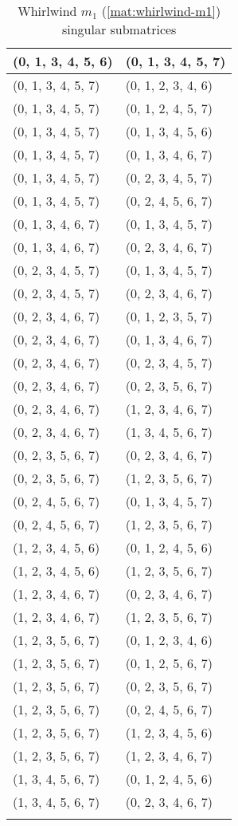 \begin{footnotesize}
\begin{longtable}[c]{|l|l|}
\\ \hline
(0, 1, 3, 4, 5, 6)
&(0, 1, 3, 4, 5, 7)
\\ \hline
(0, 1, 3, 4, 5, 7)
&(0, 1, 2, 3, 4, 6)
\\ \hline
(0, 1, 3, 4, 5, 7)
&(0, 1, 2, 4, 5, 7)
\\ \hline
(0, 1, 3, 4, 5, 7)
&(0, 1, 3, 4, 5, 6)
\\ \hline
(0, 1, 3, 4, 5, 7)
&(0, 1, 3, 4, 6, 7)
\\ \hline
(0, 1, 3, 4, 5, 7)
&(0, 2, 3, 4, 5, 7)
\\ \hline
(0, 1, 3, 4, 5, 7)
&(0, 2, 4, 5, 6, 7)
\\ \hline
(0, 1, 3, 4, 6, 7)
&(0, 1, 3, 4, 5, 7)
\\ \hline
(0, 1, 3, 4, 6, 7)
&(0, 2, 3, 4, 6, 7)
\\ \hline
(0, 2, 3, 4, 5, 7)
&(0, 1, 3, 4, 5, 7)
\\ \hline
(0, 2, 3, 4, 5, 7)
&(0, 2, 3, 4, 6, 7)
\\ \hline
(0, 2, 3, 4, 6, 7)
&(0, 1, 2, 3, 5, 7)
\\ \hline
(0, 2, 3, 4, 6, 7)
&(0, 1, 3, 4, 6, 7)
\\ \hline
(0, 2, 3, 4, 6, 7)
&(0, 2, 3, 4, 5, 7)
\\ \hline
(0, 2, 3, 4, 6, 7)
&(0, 2, 3, 5, 6, 7)
\\ \hline
(0, 2, 3, 4, 6, 7)
&(1, 2, 3, 4, 6, 7)
\\ \hline
(0, 2, 3, 4, 6, 7)
&(1, 3, 4, 5, 6, 7)
\\ \hline
(0, 2, 3, 5, 6, 7)
&(0, 2, 3, 4, 6, 7)
\\ \hline
(0, 2, 3, 5, 6, 7)
&(1, 2, 3, 5, 6, 7)
\\ \hline
(0, 2, 4, 5, 6, 7)
&(0, 1, 3, 4, 5, 7)
\\ \hline
(0, 2, 4, 5, 6, 7)
&(1, 2, 3, 5, 6, 7)
\\ \hline
(1, 2, 3, 4, 5, 6)
&(0, 1, 2, 4, 5, 6)
\\ \hline
(1, 2, 3, 4, 5, 6)
&(1, 2, 3, 5, 6, 7)
\\ \hline
(1, 2, 3, 4, 6, 7)
&(0, 2, 3, 4, 6, 7)
\\ \hline
(1, 2, 3, 4, 6, 7)
&(1, 2, 3, 5, 6, 7)
\\ \hline
(1, 2, 3, 5, 6, 7)
&(0, 1, 2, 3, 4, 6)
\\ \hline
(1, 2, 3, 5, 6, 7)
&(0, 1, 2, 5, 6, 7)
\\ \hline
(1, 2, 3, 5, 6, 7)
&(0, 2, 3, 5, 6, 7)
\\ \hline
(1, 2, 3, 5, 6, 7)
&(0, 2, 4, 5, 6, 7)
\\ \hline
(1, 2, 3, 5, 6, 7)
&(1, 2, 3, 4, 5, 6)
\\ \hline
(1, 2, 3, 5, 6, 7)
&(1, 2, 3, 4, 6, 7)
\\ \hline
(1, 3, 4, 5, 6, 7)
&(0, 1, 2, 4, 5, 6)
\\ \hline
(1, 3, 4, 5, 6, 7)
&(0, 2, 3, 4, 6, 7)
\\ \hline
\caption{Whirlwind $m_1$ (\ref{mat:whirlwind-m1}) singular submatrices}\label{tbl:m1-singular}
\end{longtable}
\end{footnotesize}
